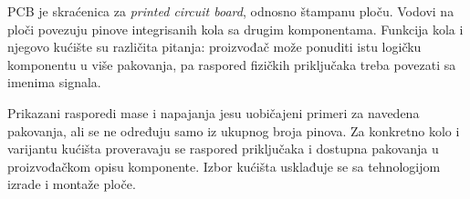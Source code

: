 
PCB je skraćenica za \emph{printed circuit board}, odnosno štampanu ploču. Vodovi na ploči povezuju pinove integrisanih kola sa drugim komponentama. Funkcija kola i njegovo kućište su različita pitanja: proizvođač može ponuditi istu logičku komponentu u više pakovanja, pa raspored fizičkih priključaka treba povezati sa imenima signala.

Prikazani rasporedi mase i napajanja jesu uobičajeni primeri za navedena pakovanja, ali se ne određuju samo iz ukupnog broja pinova. Za konkretno kolo i varijantu kućišta proveravaju se raspored priključaka i dostupna pakovanja u proizvođačkom opisu komponente. Izbor kućišta usklađuje se sa tehnologijom izrade i montaže ploče.
